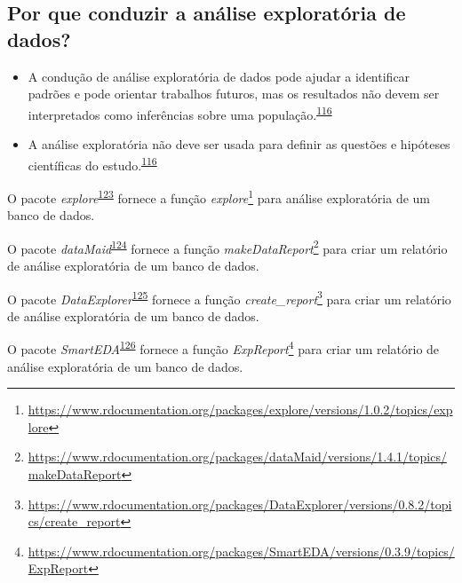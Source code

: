 \documentclass[
  a4paper,
]{book}
\renewcommand{\href}[2]{#2\footnote{\url{#1}}}
\newenvironment{infobox}[1]
  {
  \begin{itemize}
  \renewcommand{\labelitemi}{
    \raisebox{-.7\height}[0pt][0pt]{
      {\setkeys{Gin}{width=3em,keepaspectratio}
        \texttt{[image: \#1]}}
    }
  }
  \setlength{\fboxsep}{1em}
  \begin{blackbox}
  \item
  }
  {
  \end{blackbox}
  \end{itemize}
  }
\begin{document}
\hypertarget{por-que-conduzir-a-anuxe1lise-exploratuxf3ria-de-dados}{%
\subsection{Por que conduzir a análise exploratória de dados?}\label{por-que-conduzir-a-anuxe1lise-exploratuxf3ria-de-dados}}

\begin{itemize}
\item
  A condução de análise exploratória de dados pode ajudar a identificar padrões e pode orientar trabalhos futuros, mas os resultados não devem ser interpretados como inferências sobre uma população.\textsuperscript{\protect\hyperlink{ref-zuur2009}{116}}
\item
  A análise exploratória não deve ser usada para definir as questões e hipóteses científicas do estudo.\textsuperscript{\protect\hyperlink{ref-zuur2009}{116}}
\end{itemize}

\begin{infobox}{images/Rlogo}
O pacote \emph{explore}\textsuperscript{\protect\hyperlink{ref-explore}{123}} fornece a função \href{https://www.rdocumentation.org/packages/explore/versions/1.0.2/topics/explore}{\emph{explore}} para análise exploratória de um banco de dados.

\end{infobox}

\begin{infobox}{images/Rlogo}
O pacote \emph{dataMaid}\textsuperscript{\protect\hyperlink{ref-dataMaid}{124}} fornece a função \href{https://www.rdocumentation.org/packages/dataMaid/versions/1.4.1/topics/makeDataReport}{\emph{makeDataReport}} para criar um relatório de análise exploratória de um banco de dados.

\end{infobox}

\begin{infobox}{images/Rlogo}
O pacote \emph{DataExplorer}\textsuperscript{\protect\hyperlink{ref-DataExplorer-2}{125}} fornece a função \href{https://www.rdocumentation.org/packages/DataExplorer/versions/0.8.2/topics/create_report}{\emph{create\_report}} para criar um relatório de análise exploratória de um banco de dados.

\end{infobox}

\begin{infobox}{images/Rlogo}
O pacote \emph{SmartEDA}\textsuperscript{\protect\hyperlink{ref-SmartEDA}{126}} fornece a função \href{https://www.rdocumentation.org/packages/SmartEDA/versions/0.3.9/topics/ExpReport}{\emph{ExpReport}} para criar um relatório de análise exploratória de um banco de dados.

\end{infobox}
\end{document}
